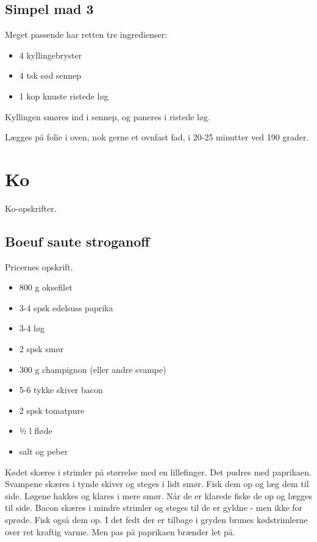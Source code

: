 \documentclass[
  letterpaper,
  DIV=11,
  numbers=noendperiod]{scrreprt}
\providecommand{\tightlist}{%
  \setlength{\itemsep}{0pt}\setlength{\parskip}{0pt}}\usepackage{longtable,booktabs,array}
\begin{document}
\hypertarget{simpel-mad-3}{%
\section{Simpel mad 3}\label{simpel-mad-3}}

Meget passende har retten tre ingredienser:

\begin{itemize}
\tightlist
\item
  4 kyllingebryster
\item
  4 tsk sød sennep
\item
  1 kop knuste ristede løg
\end{itemize}

Kyllingen smøres ind i sennep, og paneres i ristede løg.~

Lægges på folie i oven, nok gerne et ovnfast fad, i 20-25 minutter ved
190 grader.


\hypertarget{ko}{%
\chapter{Ko}\label{ko}}

Ko-opskrifter.

\hypertarget{boeuf-saute-stroganoff}{%
\section{Boeuf saute stroganoff}\label{boeuf-saute-stroganoff}}

Pricernes opskrift.

\begin{itemize}
\tightlist
\item
  800 g oksefilet
\item
  3-4 spsk edelsuss paprika
\item
  3-4 løg
\item
  2 spsk smør
\item
  300 g champignon (eller andre svampe)
\item
  5-6 tykke skiver bacon
\item
  2 spsk tomatpure
\item
  ½ l fløde
\item
  salt og peber
\end{itemize}

Kødet skæres i strimler på størrelse med en lillefinger. Det pudres med
paprikaen. Svampene skæres i tynde skiver og steges i lidt smør. Fisk
dem op og læg dem til side. Løgene hakkes og klares i mere smør. Når de
er klarede fiske de op og lægges til side. Bacon skæres i mindre
strimler og steges til de er gyldne - men ikke for sprøde. Fisk også dem
op. I det fedt der er tilbage i gryden brunes kødstrimlerne over ret
kraftig varme. Men pas på paprikaen brænder let på.
\end{document}
